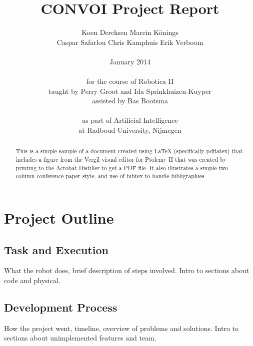 \documentclass[10pt,twocolumn]{article}
\begin{document}
\title{CONVOI Project Report}

\author{Koen Dercksen \hspace{2em} Marein K\"onings\\
Caspar Safarlou \hspace{2em} Chris Kamphuis \hspace{2em} Erik Verboom\\
\\
January 2014 \\
\\
for the course of Robotica II\\
taught by Perry Groot and Ida Sprinkhuizen-Kuyper\\
assisted by Bas Bootsma \\
\\
as part of Artificial Intelligence\\
at Radboud University, Nijmegen
}

\maketitle
\thispagestyle{empty}

\begin{abstract}
   This is a simple sample of a document created using \LaTeX
   (specifically pdflatex)
   that includes a figure from the Vergil visual editor for Ptolemy II
   that was created by printing to the Acrobat Distiller to get a PDF file.
   It also illustrates a simple two-column conference paper style,
   and use of bibtex to handle bibligraphies.
\end{abstract}

\tableofcontents

\section{Project Outline}

\subsection{Task and Execution}
What the robot does, brief description of steps involved. Intro to sections about code and physical.

\subsection{Development Process}
How the project went, timeline, overview of problems and solutions. Intro to sections about unimplemented features and team.
\end{document}
